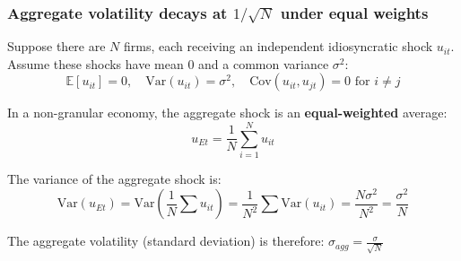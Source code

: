\documentclass[aspectratio=169,11pt]{beamer}
\begin{document}
\begin{frame}
    \frametitle{Aggregate volatility decays at $1/\sqrt{N}$ under equal weights}
    
    \vspace{0.4cm}
    Suppose there are $N$ firms, each receiving an independent idiosyncratic shock $u_{it}$.
    Assume these shocks have mean 0 and a common variance $\sigma^2$:
    \begin{equation*}
        \mathbb{E}[u_{it}] = 0, \quad \text{Var}(u_{it}) = \sigma^2, \quad \text{Cov}(u_{it}, u_{jt}) = 0 \text{ for } i \neq j
    \end{equation*}

    \vspace{0.4cm}
    In a non-granular economy, the aggregate shock is an \textbf{equal-weighted} average:
    \begin{equation*}
        u_{Et} = \frac{1}{N} \sum_{i=1}^N u_{it}
    \end{equation*}

    \vspace{0.4cm}
    The variance of the aggregate shock is:
    \begin{equation*}
        \text{Var}(u_{Et}) = \text{Var}\left( \frac{1}{N} \sum u_{it} \right) = \frac{1}{N^2} \sum \text{Var}(u_{it}) = \frac{N \sigma^2}{N^2} = \frac{\sigma^2}{N}
    \end{equation*}

    \vspace{0.4cm}
    {\Large
        The aggregate volatility (standard deviation) is therefore:
        \textcolor{WarmOrange}{\boldmath $\sigma_{agg} = \frac{\sigma}{\sqrt{N}}$}
    }

\end{frame}
\end{document}
